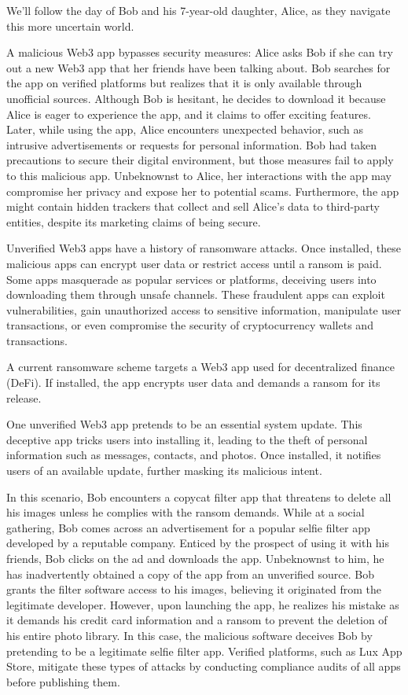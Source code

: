 \documentclass[11pt]{article}
\begin{document}
We'll follow the day of Bob and his 7-year-old daughter, Alice, as they navigate this more uncertain world.


A malicious Web3 app bypasses security measures: Alice asks Bob if she can try out a new Web3 app that her friends have been talking about. Bob searches for the app on verified platforms but realizes that it is only available through unofficial sources. Although Bob is hesitant, he decides to download it because Alice is eager to experience the app, and it claims to offer exciting features. Later, while using the app, Alice encounters unexpected behavior, such as intrusive advertisements or requests for personal information. Bob had taken precautions to secure their digital environment, but those measures fail to apply to this malicious app. Unbeknownst to Alice, her interactions with the app may compromise her privacy and expose her to potential scams. Furthermore, the app might contain hidden trackers that collect and sell Alice's data to third-party entities, despite its marketing claims of being secure.


Unverified Web3 apps have a history of ransomware attacks. Once installed, these malicious apps can encrypt user data or restrict access until a ransom is paid. Some apps masquerade as popular services or platforms, deceiving users into downloading them through unsafe channels. These fraudulent apps can exploit vulnerabilities, gain unauthorized access to sensitive information, manipulate user transactions, or even compromise the security of cryptocurrency wallets and transactions.


A current ransomware scheme targets a Web3 app used for decentralized finance (DeFi). If installed, the app encrypts user data and demands a ransom for its release.


One unverified Web3 app pretends to be an essential system update. This deceptive app tricks users into installing it, leading to the theft of personal information such as messages, contacts, and photos. Once installed, it notifies users of an available update, further masking its malicious intent.


In this scenario, Bob encounters a copycat filter app that threatens to delete all his images unless he complies with the ransom demands. While at a social gathering, Bob comes across an advertisement for a popular selfie filter app developed by a reputable company. Enticed by the prospect of using it with his friends, Bob clicks on the ad and downloads the app. Unbeknownst to him, he has inadvertently obtained a copy of the app from an unverified source. Bob grants the filter software access to his images, believing it originated from the legitimate developer. However, upon launching the app, he realizes his mistake as it demands his credit card information and a ransom to prevent the deletion of his entire photo library. In this case, the malicious software deceives Bob by pretending to be a legitimate selfie filter app. Verified platforms, such as Lux App Store, mitigate these types of attacks by conducting compliance audits of all apps before publishing them.
\end{document}
